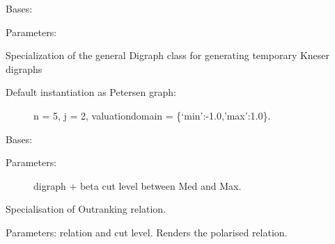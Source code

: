 \documentclass[letterpaper,10pt,english]{sphinxmanual}
\begin{document}
\begin{fulllineitems}
\label{techDoc:digraphs.KneserDigraph}
Bases: {\hyperref[techDoc:digraphs.Digraph]{}}
\begin{description}
\item[{Parameters:}] \leavevmode
{}

\end{description}

Specialization of the general Digraph class for generating
temporary Kneser digraphs
\begin{description}
\item[{Default instantiation as Petersen graph:}] \leavevmode
n = 5, j = 2, valuationdomain = \{`min':-1.0,'max':1.0\}.

\end{description}

\begin{fulllineitems}
\label{techDoc:digraphs.KneserDigraph.showShort}
\end{fulllineitems}


\end{fulllineitems}


\begin{fulllineitems}
\label{techDoc:digraphs.MedianExtendedDigraph}
Bases: {\hyperref[techDoc:digraphs.Digraph]{}}
\begin{description}
\item[{Parameters:}] \leavevmode
digraph + beta cut level between Med and Max.

\end{description}

Specialisation of Outranking relation.

\begin{fulllineitems}
\label{techDoc:digraphs.MedianExtendedDigraph.constructRelation}
Parameters: relation and cut level.
Renders the polarised relation.

\end{fulllineitems}


\end{fulllineitems}
\end{document}
